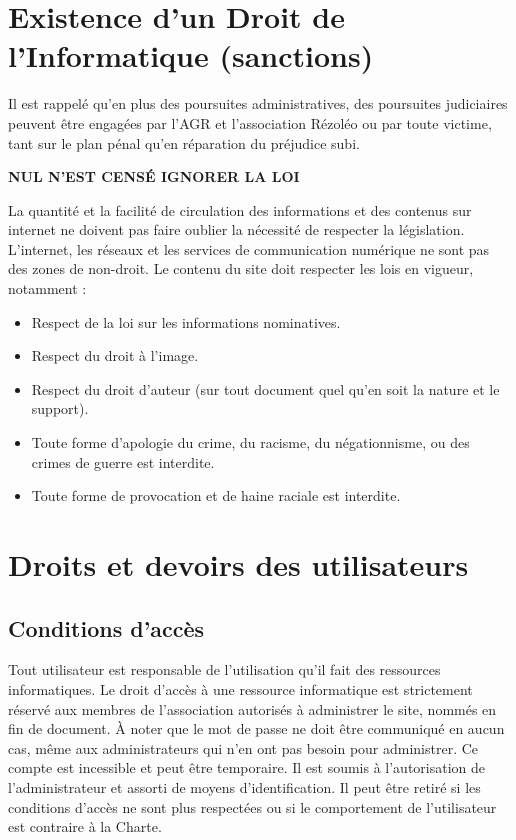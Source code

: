 \documentclass[10pt,a4paper]{article}
\begin{document}
\section{Existence d'un Droit de l'Informatique (sanctions)}
Il est rappelé qu'en plus des poursuites administratives, des poursuites judiciaires peuvent être engagées par l'AGR et l'association Rézoléo ou par toute victime, tant sur le plan pénal qu'en réparation du préjudice subi.
\begin{center}
\textbf{NUL N'EST CENSÉ IGNORER LA LOI}
\end{center}

La quantité et la facilité de circulation des informations et des contenus sur internet ne doivent pas faire oublier la nécessité de respecter la législation. L'internet, les réseaux et les services de communication numérique ne sont pas des zones de non-droit.
Le contenu du site doit respecter les lois en vigueur, notamment :
\begin{itemize}
\item Respect de la loi sur les informations nominatives.
\item Respect du droit à l'image.
\item Respect du droit d'auteur (sur tout document quel qu'en soit la nature et le support).
\item Toute forme d'apologie du crime, du racisme, du négationnisme, ou des crimes de guerre est interdite.
\item Toute forme de provocation et de haine raciale est interdite.
\end{itemize}


\section{Droits et devoirs des utilisateurs}
\subsection{Conditions d'accès}
Tout utilisateur est responsable de l'utilisation qu'il fait des ressources informatiques. Le droit d'accès à une ressource informatique est strictement réservé aux membres de l'association autorisés à administrer le site, nommés en fin de document. À noter que le mot de passe ne doit être communiqué en aucun cas, même aux administrateurs qui n'en ont pas besoin pour administrer. Ce compte est incessible et peut être temporaire. Il est soumis à l'autorisation de l'administrateur et assorti de moyens d'identification. Il peut être retiré si les conditions d'accès ne sont plus respectées ou si le comportement de l'utilisateur est contraire à la Charte.\\
\end{document}
